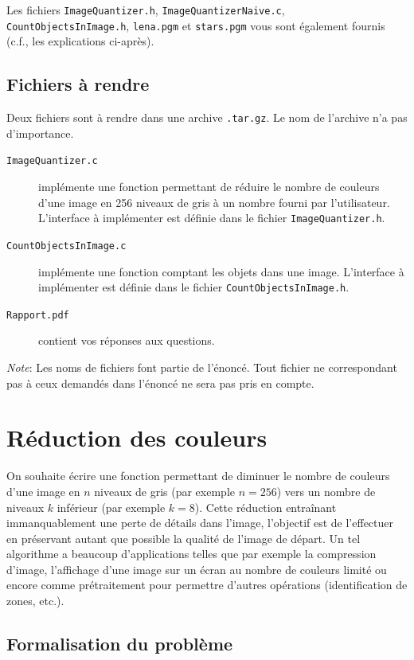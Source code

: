 \documentclass[a4paper,10pt]{article}
\begin{document}
Les fichiers \texttt{ImageQuantizer.h}, \texttt{ImageQuantizerNaive.c}, \texttt{CountObjectsInImage.h}, \texttt{lena.pgm} et \texttt{stars.pgm} vous sont également fournis (c.f., les explications ci-après).

\subsection*{Fichiers à rendre}

Deux fichiers sont à rendre dans une archive \texttt{.tar.gz}. Le nom de l'archive n'a pas d'importance.

\begin{description}
\item[\texttt{ImageQuantizer.c}] implémente une fonction permettant de réduire le nombre de couleurs d'une image en 256 niveaux de gris à un nombre fourni par l'utilisateur. L'interface à implémenter est définie dans le fichier \texttt{ImageQuantizer.h}.
\item[\texttt{CountObjectsInImage.c}] implémente une fonction comptant les objets dans une image. L'interface à implémenter est définie dans le fichier \texttt{CountObjectsInImage.h}.
\item[\texttt{Rapport.pdf}] contient vos réponses aux questions.
\end{description}

{\em Note}: Les noms de fichiers font partie de l'énoncé. Tout fichier ne
correspondant pas à ceux demandés dans l'énoncé ne sera pas pris en compte.

\section{Réduction des couleurs}

On souhaite écrire une fonction permettant de diminuer le nombre de
couleurs d'une image en $n$ niveaux de gris (par exemple $n=256$) vers
un nombre de niveaux $k$ inférieur (par exemple $k=8$). Cette
réduction entraînant immanquablement une perte de détails dans
l'image, l'objectif est de l'effectuer en préservant autant que
possible la qualité de l'image de départ. Un tel algorithme a beaucoup
d'applications telles que par exemple la compression d'image,
l'affichage d'une image sur un écran au nombre de couleurs limité ou
encore comme prétraitement pour permettre d'autres opérations
(identification de zones, etc.).

\subsection*{Formalisation du problème}
\end{document}
